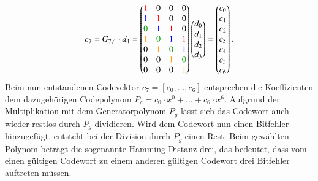 \[
    c_7=G_{7,4} \cdot d_4=
    \begin{pmatrix}
              \textcolor{red}{1} &                       0  &                       0  &                       0  \\
             \textcolor{blue}{1} &       \textcolor{red}{1} &                       0  &                       0  \\
        \textcolor{darkgreen}{0} &      \textcolor{blue}{1} &       \textcolor{red}{1} &                       0  \\
           \textcolor{orange}{1} & \textcolor{darkgreen}{0} &      \textcolor{blue}{1} &       \textcolor{red}{1} \\
                              0  &    \textcolor{orange}{1} & \textcolor{darkgreen}{0} &      \textcolor{blue}{1} \\
                              0  &                       0  &    \textcolor{orange}{1} & \textcolor{darkgreen}{0} \\
                              0  &                       0  &                       0  &    \textcolor{orange}{1} 
    \end{pmatrix}
    \begin{pmatrix}
        d_0\\        
        d_1\\
        d_2\\
        d_3
    \end{pmatrix}
    =
    \begin{pmatrix}
        c_0\\        
        c_1\\
        c_2\\
        c_3\\
        c_4\\
        c_5\\
        c_6\\
    \end{pmatrix}.
\]
Beim nun entstandenen Codevektor $c_7=[c_0, ..., c_6]$ entsprechen die Koeffizienten dem dazugehörigen Codepolynom $P_c=c_0\cdot x^0+...+c_6\cdot x^6$.
Aufgrund der Multiplikation mit dem Generatorpolynom $P_g$ lässt sich das Codewort auch wieder restlos durch $P_g$ dividieren.
Wird dem Codewort nun einen Bitfehler hinzugefügt, entsteht bei der Division durch $P_g$ einen Rest.
Beim gewählten Polynom beträgt die sogenannte Hamming-Distanz drei, das bedeutet,
%
dass vom einen gültigen Codewort zu einem anderen gültigen Codewort drei Bitfehler auftreten müssen.
